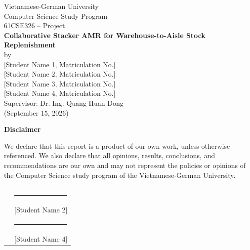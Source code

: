 \documentclass[12pt,a4paper]{article}
\begin{document}
\begin{titlepage}
    \centering
    \vspace*{1.5cm}
    
    {\large Vietnamese-German University}\\[0.3cm]
    {\large Computer Science Study Program}\\[3.5cm]

    {\large 61CSE326 -- Project}\\[0.8cm]
    {\Large \textbf{Collaborative Stacker AMR for Warehouse-to-Aisle Stock Replenishment}}\\[3.5cm]

    {\large by}\\[0.8cm]
    {\large [Student Name 1, Matriculation No.]}\\
    {\large [Student Name 2, Matriculation No.]}\\
    {\large [Student Name 3, Matriculation No.]}\\
    {\large [Student Name 4, Matriculation No.]}\\[3.5cm]

    {\large Supervisor: Dr.-Ing. Quang Huan Dong}\\[2.5cm]

    \vfill
    {\large (September 15, 2026)}
\end{titlepage}

\newpage
\thispagestyle{plain}

\noindent \textbf{\Large Disclaimer}

\vspace{1.5cm}
\noindent We declare that this report is a product of our own work, unless otherwise referenced. We also declare that all opinions, results, conclusions, and recommendations are our own and may not represent the policies or opinions of the Computer Science study program of the Vietnamese-German University.

\vspace{4.5cm}
\noindent
\begin{tabularx}{\textwidth}{XX}
    \rule{5.5cm}{0.4pt} & \rule{5.5cm}{0.4pt} \\
    [Student Name 1] & [Student Name 2] \\[3cm]
    \rule{5.5cm}{0.4pt} & \rule{5.5cm}{0.4pt} \\
    [Student Name 3] & [Student Name 4] \\
\end{tabularx}
\end{document}
